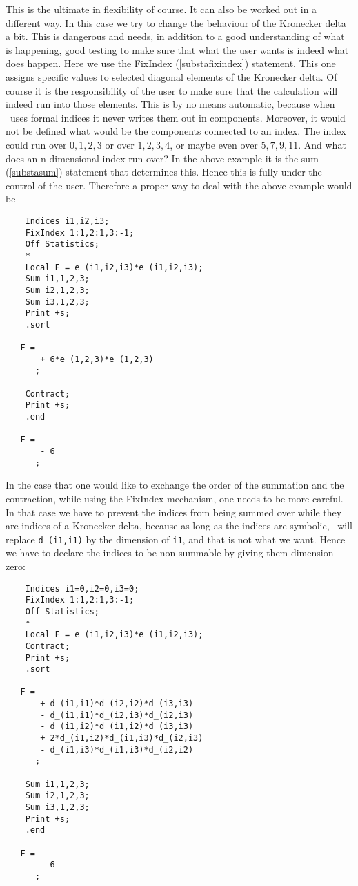 This is the ultimate in flexibility of course. It can 
also be worked out in a different way. In this case we try to change the 
behaviour of the Kronecker delta a 
bit. This is dangerous and needs, in addition to a good 
understanding of what is happening, good testing to make sure that what the 
user wants is indeed what does happen. Here we use the 
FixIndex (\ref{substafixindex}) statement. This one assigns 
specific values to selected diagonal elements of the Kronecker delta. Of 
course it is the responsibility of the user to make sure that the 
calculation will indeed run into those elements. This is by no means 
automatic, because when \FORM\ uses formal indices it never writes them out 
in components. Moreover, it would not be defined what would be the 
components connected to an index. The index could run over $0,1,2,3$ or 
over $1,2,3,4$, or maybe even over $5,7,9,11$. And what does an 
n-dimensional index run over? In the above example it is the sum 
(\ref{substasum}) statement that determines this. Hence this is fully under 
the control of the user. Therefore a proper way to deal with the above 
example would be
\begin{verbatim}
    Indices i1,i2,i3;
    FixIndex 1:1,2:1,3:-1;
    Off Statistics;
    *
    Local F = e_(i1,i2,i3)*e_(i1,i2,i3);
    Sum i1,1,2,3;
    Sum i2,1,2,3;
    Sum i3,1,2,3;
    Print +s;
    .sort

   F =
       + 6*e_(1,2,3)*e_(1,2,3)
      ;

    Contract;
    Print +s;
    .end

   F =
       - 6
      ;
\end{verbatim}
In the case that one would like to exchange the order of the summation and 
the contraction, while using the FixIndex mechanism, one needs to be more 
careful. In that case we have to prevent the indices from being summed over 
while they are indices of a Kronecker delta, because as long as the indices 
are symbolic, \FORM\ will replace \verb:d_(i1,i1): by the dimension of 
\verb:i1:, and that is not what we want. Hence we have to declare the 
indices to be non-summable by giving them dimension zero:
\begin{verbatim}
    Indices i1=0,i2=0,i3=0;
    FixIndex 1:1,2:1,3:-1;
    Off Statistics;
    *
    Local F = e_(i1,i2,i3)*e_(i1,i2,i3);
    Contract;
    Print +s;
    .sort

   F =
       + d_(i1,i1)*d_(i2,i2)*d_(i3,i3)
       - d_(i1,i1)*d_(i2,i3)*d_(i2,i3)
       - d_(i1,i2)*d_(i1,i2)*d_(i3,i3)
       + 2*d_(i1,i2)*d_(i1,i3)*d_(i2,i3)
       - d_(i1,i3)*d_(i1,i3)*d_(i2,i2)
      ;

    Sum i1,1,2,3;
    Sum i2,1,2,3;
    Sum i3,1,2,3;
    Print +s;
    .end

   F =
       - 6
      ;
\end{verbatim}
